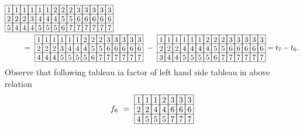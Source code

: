 \begin{align*}
&
\begin{array}[c]{*{14}c}\cline{1-14}
\lr{1}&\lr{1}&\lr{1}&\lr{1}&\lr{1}&\lr{1}&\lr{2}&\lr{2}&\lr{2}&\lr{3}&\lr{3}&\lr{3}&\lr{3}&\lr{3}\\\cline{1-14}
\lr{2}&\lr{2}&\lr{2}&\lr{3}&\lr{4}&\lr{4}&\lr{4}&\lr{5}&\lr{5}&\lr{6}&\lr{6}&\lr{6}&\lr{6}&\lr{6}\\\cline{1-14}
\lr{5}&\lr{4}&\lr{4}&\lr{4}&\lr{5}&\lr{5}&\lr{5}&\lr{6}&\lr{7}&\lr{7}&\lr{7}&\lr{7}&\lr{7}&\lr{7}\\\cline{1-14}
\end{array}\\
&\hspace{20pt}
\ =\ 
\begin{array}[c]{*{14}c}\cline{1-14}
\lr{1}&\lr{1}&\lr{1}&\lr{1}&\lr{1}&\lr{1}&\lr{2}&\lr{2}&\lr{2}&\lr{3}&\lr{3}&\lr{3}&\lr{3}&\lr{3}\\\cline{1-14}
\lr{2}&\lr{2}&\lr{2}&\lr{3}&\lr{4}&\lr{4}&\lr{4}&\lr{5}&\lr{5}&\lr{6}&\lr{6}&\lr{6}&\lr{6}&\lr{6}\\\cline{1-14}
\lr{4}&\lr{4}&\lr{4}&\lr{5}&\lr{5}&\lr{5}&\lr{5}&\lr{6}&\lr{7}&\lr{7}&\lr{7}&\lr{7}&\lr{7}&\lr{7}\\\cline{1-14}
\end{array}
\ -\ 
\begin{array}[c]{*{14}c}\cline{1-14}
\lr{1}&\lr{1}&\lr{1}&\lr{1}&\lr{1}&\lr{1}&\lr{2}&\lr{2}&\lr{2}&\lr{3}&\lr{3}&\lr{3}&\lr{3}&\lr{3}\\\cline{1-14}
\lr{2}&\lr{2}&\lr{2}&\lr{4}&\lr{4}&\lr{4}&\lr{4}&\lr{5}&\lr{5}&\lr{6}&\lr{6}&\lr{6}&\lr{6}&\lr{6}\\\cline{1-14}
\lr{3}&\lr{4}&\lr{4}&\lr{5}&\lr{5}&\lr{5}&\lr{5}&\lr{6}&\lr{7}&\lr{7}&\lr{7}&\lr{7}&\lr{7}&\lr{7}\\\cline{1-14}
\end{array}
= t_7 - t_6.
\end{align*}
Observe that following tableau ia factor of left hand side tableau in above relation
\[
f_6\ =\ 
\begin{array}[c]{*{7}c}\cline{1-7}
\lr{1}&\lr{1}&\lr{1}&\lr{2}&\lr{3}&\lr{3}&\lr{3}\\\cline{1-7}
\lr{2}&\lr{2}&\lr{4}&\lr{4}&\lr{6}&\lr{6}&\lr{6}\\\cline{1-7}
\lr{4}&\lr{5}&\lr{5}&\lr{5}&\lr{7}&\lr{7}&\lr{7}\\\cline{1-7}
\end{array}
\]
\eat{
}%
%




